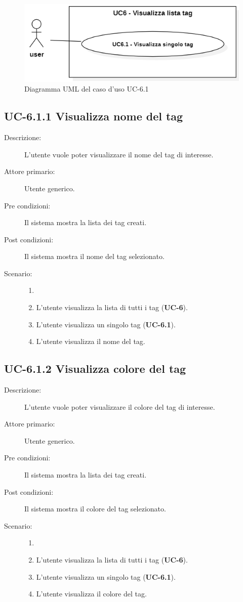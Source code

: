 \begin{figure}[H]
    \centering
    \includegraphics[width=0.8\linewidth]{UC6.1.png} %
    \caption{Diagramma UML del caso d'uso UC-6.1}
    \label{fig:UC8.10}
\end{figure}
\subsection{UC-6.1.1 Visualizza nome del tag}
\begin{description}
    \item[Descrizione:] L’utente vuole poter visualizzare il nome del tag di interesse.
    \item[Attore primario:] Utente generico.
    \item[Pre condizioni:] Il sistema mostra la lista dei tag creati.
    \item[Post condizioni:] Il sistema mostra il nome del tag selezionato.
    \item[Scenario:]
    \begin{enumerate}
        \item[]
        \item L’utente visualizza la lista di tutti i tag (\textbf{UC-6}).
        \item L'utente visualizza un singolo tag (\textbf{UC-6.1}).
        \item L'utente visualizza il nome del tag.
    \end{enumerate}
\end{description}

\subsection{UC-6.1.2 Visualizza colore del tag}
\begin{description}
    \item[Descrizione:] L’utente vuole poter visualizzare il colore del tag di interesse.
    \item[Attore primario:] Utente generico.
    \item[Pre condizioni:] Il sistema mostra la lista dei tag creati.
    \item[Post condizioni:] Il sistema mostra il colore del tag selezionato.
    \item[Scenario:] 
    \begin{enumerate}
        \item[]
        \item L’utente visualizza la lista di tutti i tag (\textbf{UC-6}).
        \item L'utente visualizza un singolo tag (\textbf{UC-6.1}).
        \item L'utente visualizza il colore del tag.
    \end{enumerate}
\end{description}

